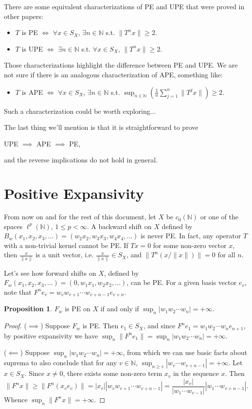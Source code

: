 \documentclass{article}
\theoremstyle{definition}\newtheorem{remark}[theorem]{Remark}
\theoremstyle{definition}\newtheorem{example}[theorem]{Example}
\theoremstyle{definition}\newtheorem{fact}[theorem]{Fact}
\theoremstyle{definition}\newtheorem{diagram}[theorem]{Diagram}
\theoremstyle{definition}\newtheorem{definition}[theorem]{Definition}
\theoremstyle{definition}\newtheorem{question}[theorem]{Question}
\newtheorem{proposition}[theorem]{Proposition}
\newcommand{\N}{\mathbb{N}}
\begin{document}
There are some equivalent characterizations of PE and UPE that were proved in other papers:
\begin{itemize}
    \item $T$ is PE $\iff$ $\forall x\in S_X$, $\exists n\in \N$ s.t. $\|T^n x\|\geq 2$.
    \item $T$ is UPE $\iff$ $\exists n\in \N$ s.t. $\forall x\in S_X$, $\|T^n x\|\geq 2$.
\end{itemize}
Those characterizations highlight the difference between PE and UPE. We are not sure if there is an analogous characterization of APE, something like:
\begin{itemize}
    \item $T$ is APE $\iff$ $\forall x\in S_X$, $\exists n\in \N$ s.t. $\sup_{n\in \N} \left(\frac {1}{n} \sum_{j=1}^n \|T^j x\|\right)\geq 2$.
\end{itemize}
Such a characterization could be worth exploring...

The last thing we'll mention is that it is straightforward to prove 
\begin{center}
    UPE $\implies $ APE $\implies$ PE,
\end{center}
and the reverse implications do not hold in general.

\section{Positive Expansivity}
From now on and for the rest of this document, let $X$ be $c_0(\N)$ or one of the spaces $\ell^p(\N)$, $1\leq p<\infty$. A backward shift on $X$ defined by $B_w(x_1,x_2,x_3,\ldots)=(w_2 x_2, w_3 x_3, w_4 x_4,\ldots)$ is never PE. In fact, any operator $T$ with a non-trivial kernel cannot be PE. If $Tx=0$ for some non-zero vector $x$, then $\frac{x}{\|x\|}$ is a unit vector, i.e. $\frac{x}{\|x\|}\in S_X$, and $\|T^n(x/\|x\|)\|=0$ for all $n$.

Let's see how forward shifts on $X$, defined by $F_w (x_1,x_2,x_3,\ldots)=(0,w_1x_1,w_2x_2,\ldots)$, can be PE. For a given basis vector $e_v$, note that $F^n e_v=w_v w_{v+1}\cdots w_{v+n-1} e_{v+n}$.

\begin{proposition}
    $F_w$ is PE on $X$ if and only if $\sup_{n} |w_1 w_2 \cdots w_n|=+\infty$.
\end{proposition}

\begin{proof}
    ($\implies$) Suppose $F_w$ is PE. Then $e_1\in S_X$, and since $F^n e_1 = w_1w_2\cdots w_n e_{n+1}$, by positive expansivity we have $\sup_{n} \|F^n e_1\|=\sup_n |w_1w_2\cdots w_n|=+\infty$.

    ($\impliedby$) Suppose $\sup_{n} |w_1 w_2 \cdots w_n|=+\infty$, from which we can use basic facts about suprema to also conclude that for any $v\in \N$, $\sup_{n\geq v} |w_v\cdots w_{v+n-1}|=+\infty$. Let $x\in S_X$. Since $x\not = 0$, there exists some non-zero term $x_v$ in the sequence $x$. Then
    \[\|F^n x\| \geq \|F^n(x_v e_v)\|=|x_v| |w_v w_{v+1}\cdots w_{v+n-1}|=\frac{|x_v|}{|w_1\cdots w_{v-1}|} |w_1\cdots w_{v+n-1}|.\]
    Whence $\sup_n \|F^n x\|=+\infty$.
\end{proof}
\end{document}
